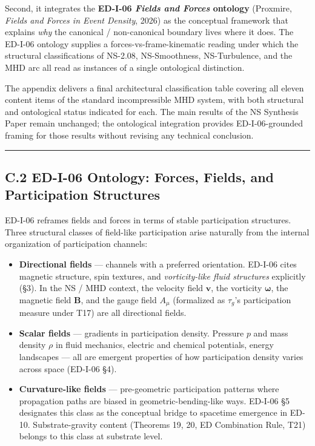 \documentclass[
]{article}
\providecommand{\tightlist}{%
  \setlength{\itemsep}{0pt}\setlength{\parskip}{0pt}}
\begin{document}
Second, it integrates the \textbf{ED-I-06 \emph{Fields and Forces}
ontology} (Proxmire, \emph{Fields and Forces in Event Density}, 2026) as
the conceptual framework that explains \emph{why} the canonical /
non-canonical boundary lives where it does. The ED-I-06 ontology
supplies a forces-vs-frame-kinematic reading under which the structural
classifications of NS-2.08, NS-Smoothness, NS-Turbulence, and the MHD
arc all read as instances of a single ontological distinction.

The appendix delivers a final architectural classification table
covering all eleven content items of the standard incompressible MHD
system, with both structural and ontological status indicated for each.
The main results of the NS Synthesis Paper remain unchanged; the
ontological integration provides ED-I-06-grounded framing for those
results without revising any technical conclusion.

\begin{center}\rule{0.5\linewidth}{0.5pt}\end{center}

\subsection{C.2 ED-I-06 Ontology: Forces, Fields, and Participation
Structures}\label{c.2-ed-i-06-ontology-forces-fields-and-participation-structures}

ED-I-06 reframes fields and forces in terms of stable participation
structures. Three structural classes of field-like participation arise
naturally from the internal organization of participation channels:

\begin{itemize}
\tightlist
\item
  \textbf{Directional fields} --- channels with a preferred orientation.
  ED-I-06 cites magnetic structure, spin textures, and
  \emph{vorticity-like fluid structures} explicitly (§3). In the NS /
  MHD context, the velocity field \(\mathbf{v}\), the vorticity
  \(\boldsymbol{\omega}\), the magnetic field \(\mathbf{B}\), and the
  gauge field \(A_\mu\) (formalized as \(\tau_g\)'s participation
  measure under T17) are all directional fields.
\item
  \textbf{Scalar fields} --- gradients in participation density.
  Pressure \(p\) and mass density \(\rho\) in fluid mechanics, electric
  and chemical potentials, energy landscapes --- all are emergent
  properties of how participation density varies across space (ED-I-06
  §4).
\item
  \textbf{Curvature-like fields} --- pre-geometric participation
  patterns where propagation paths are biased in geometric-bending-like
  ways. ED-I-06 §5 designates this class as the conceptual bridge to
  spacetime emergence in ED-10. Substrate-gravity content (Theorems 19,
  20, ED Combination Rule, T21) belongs to this class at substrate
  level.
\end{itemize}
\end{document}
